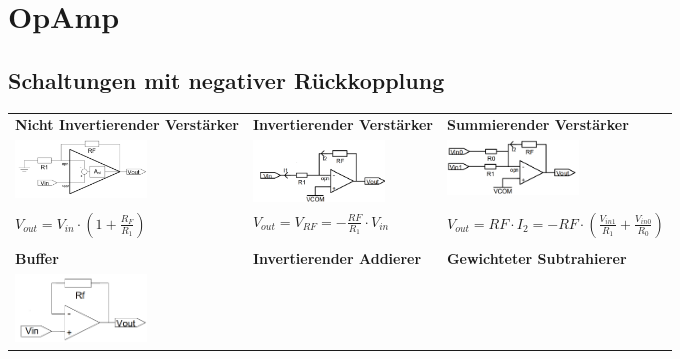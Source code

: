 \documentclass[margin=normal]{tex/hsrzf}
\begin{document}
\section{OpAmp}
\subsection{Schaltungen mit negativer Rückkopplung}
\begingroup
\small
\begin{tabularx}{0.8\textwidth}{p{155pt}p{155pt}p{155pt}}
  \textbf{Nicht Invertierender Verstärker}                                                          &
  \textbf{Invertierender Verstärker}                                                                &
  \textbf{Summierender Verstärker}                                                                    \\
  \includegraphics[width = 3.5cm]{img/OpAmp/Verstaerker_nicht_invertierend.png}                     &
  \includegraphics[width = 3.5cm]{img/OpAmp/Verstaerker_invertierend.png}                           &
  \includegraphics[width = 3.5cm]{img/OpAmp/Verstaerker_summierend.png}                               \\
  $ V_{out} = V_{in} \cdot (1 + \frac{R_F}{R_1})$                                                   &
  $ V_{out} = V_{RF} = -\frac{RF}{R_1}\cdot V_{in}$                                                 &
  $ V_{out} = RF \cdot I_2 = -RF \cdot (\frac{V_{in1}}{R_1} + \frac{V_{in0}}{R_0}) $                  \\
  \\
  \textbf{Buffer}                                                                                   &
  \textbf{Invertierender Addierer}                                                                  &
  \textbf{Gewichteter Subtrahierer}                                                                   \\
  \includegraphics[width = 3.5cm]{img/OpAmp/Buffer.png}                                             &

\end{tabularx}
\end{document}
